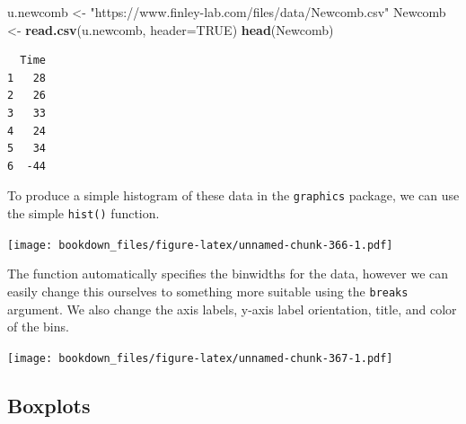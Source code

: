 \documentclass[
]{krantz}
\makeatletter
\newenvironment{Shaded}{\begin{snugshade}}{\end{snugshade}}
\newcommand{\DataTypeTok}[1]{\textcolor[rgb]{0.27,0.27,0.27}{#1}}
\newcommand{\DecValTok}[1]{\textcolor[rgb]{0.06,0.06,0.06}{#1}}
\newcommand{\KeywordTok}[1]{\textcolor[rgb]{0.27,0.27,0.27}{\textbf{#1}}}
\newcommand{\NormalTok}[1]{#1}
\newcommand{\OperatorTok}[1]{\textcolor[rgb]{0.43,0.43,0.43}{\textbf{#1}}}
\newcommand{\OtherTok}[1]{\textcolor[rgb]{0.37,0.37,0.37}{#1}}
\newcommand{\StringTok}[1]{\textcolor[rgb]{0.5,0.5,0.5}{#1}}
\newenvironment{kframe}{%
\medskip{}
\setlength{\fboxsep}{.8em}
 \def\at@end@of@kframe{}%
 \ifinner\ifhmode%
  \def\at@end@of@kframe{\end{minipage}}%
  \begin{minipage}{\columnwidth}%
 \fi\fi%
 \def\FrameCommand##1{\hskip\@totalleftmargin \hskip-\fboxsep
 \colorbox{shadecolor}{##1}\hskip-\fboxsep
     \hskip-\linewidth \hskip-\@totalleftmargin \hskip\columnwidth}%
 \MakeFramed {\advance\hsize-\width
   \@totalleftmargin\z@ \linewidth\hsize
   \@setminipage}}%
 {\par\unskip\endMakeFramed%
 \at@end@of@kframe}
\renewenvironment{Shaded}{\begin{kframe}}{\end{kframe}}
\makeatother
\begin{document}
\begin{Shaded}
\begin{Highlighting}[]
\NormalTok{u.newcomb \textless{}{-}}\StringTok{ "https://www.finley{-}lab.com/files/data/Newcomb.csv"}
\NormalTok{Newcomb \textless{}{-}}\StringTok{ }\KeywordTok{read.csv}\NormalTok{(u.newcomb, }\DataTypeTok{header=}\OtherTok{TRUE}\NormalTok{)}
\KeywordTok{head}\NormalTok{(Newcomb)}
\end{Highlighting}
\end{Shaded}

\begin{verbatim}
  Time
1   28
2   26
3   33
4   24
5   34
6  -44
\end{verbatim}

To produce a simple histogram of these data in the \texttt{graphics} package, we can use the simple \texttt{hist()} function.

\begin{Shaded}
\end{Shaded}

\texttt{[image: bookdown\_files/figure-latex/unnamed-chunk-366-1.pdf]}

The function automatically specifies the binwidths for the data, however we can easily change this ourselves to something more suitable using the \texttt{breaks} argument. We also change the axis labels, y-axis label orientation, title, and color of the bins.

\begin{Shaded}
\end{Shaded}

\texttt{[image: bookdown\_files/figure-latex/unnamed-chunk-367-1.pdf]}

\hypertarget{graphics9}{%
\subsection{Boxplots}\label{graphics9}}
\end{document}
